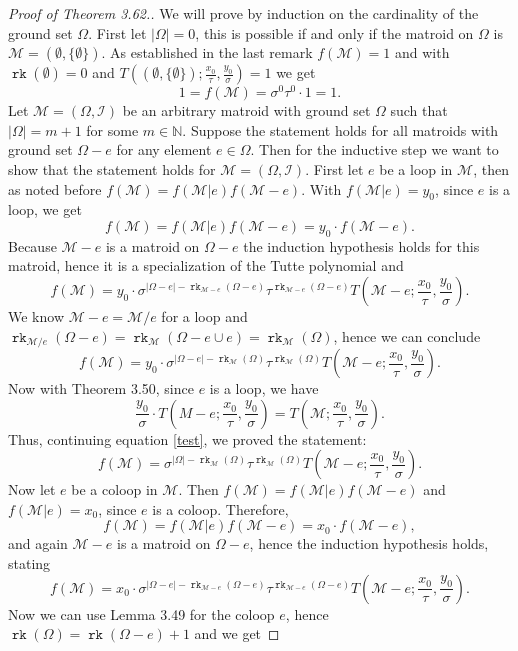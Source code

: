 \documentclass[12pt,a4paper, twoside, autooneside=false]{scrartcl}
\theoremstyle{definition}
\theoremstyle{remark}
\numberwithin{equation}{section}
\DeclareMathOperator{\rk}{\mathtt{rk}}
\newcommand{\M}{\mathcal{M}} %
\begin{document}
\begin{proof}[Proof of Theorem 3.62.]
We will prove by induction on the cardinality of the ground set $\Omega$. First let $|\Omega| = 0$, this is possible if and only if the matroid on $\Omega$ is $\M = (\emptyset, \{\emptyset\})$. As established in the last remark $f(\M)= 1$ and with $\rk(\emptyset) = 0$ and $T((\emptyset, \{\emptyset\}); \frac{x_0}{\tau}, \frac{y_0}{\sigma}) = 1$ we get 
\[
1 = f(\M) = \sigma^0 \tau^0 \cdot 1 = 1. 
\]
Let $\M = (\Omega, \mathcal{I})$ be an arbitrary matroid with ground set $\Omega$ such that $|\Omega| = m + 1$ for some $m \in \mathbb{N}$. Suppose the statement holds for all matroids with ground set $\Omega - e$ for any element $e \in \Omega$. Then for the inductive step we want to show that the statement holds for $\M = (\Omega, \mathcal{I})$. First let $e$ be a loop in $\M$, then as noted before $f(\M) = f(\M|e)f(\M - e)$. With $f(\M|e) = y_0$, since $e$ is a loop, we get 
\[
f(\M) = f(\M |e) f(\M - e) = y_0 \cdot f(\M - e).
\]
Because $\M - e$ is a matroid on $\Omega - e$ the induction hypothesis holds for this matroid, hence it is a specialization of the Tutte polynomial and
\[
f(\M) = y_0 \cdot \sigma^{|\Omega - e| - \rk_{\M - e}(\Omega - e)}\tau^{\rk_{\M - e}(\Omega - e)}T\left(\M - e; \frac{x_0}{\tau}, \frac{y_0}{\sigma}\right).
\]
We know $\M - e = \M / e$ for a loop and $\rk_{\M / e}(\Omega - e) = \rk_\M(\Omega - e \cup e) = \rk_\M(\Omega)$, hence we can conclude 
\begin{equation}\label{test}
f(\M) = y_0 \cdot \sigma^{|\Omega - e| - \rk_{\M}(\Omega)}\tau^{\rk_{\M}(\Omega)}T\left(\M - e; \frac{x_0}{\tau}, \frac{y_0}{\sigma}\right).
\end{equation} Now with Theorem 3.50, since $e$ is a loop, we have
\[
\frac{y_0}{\sigma} \cdot T\left(M - e; \frac{x_0}{\tau}, \frac{y_0}{\sigma}\right) = T\left(\M; \frac{x_0}{\tau}, \frac{y_0}{\sigma}\right).
\]
Thus, continuing equation \eqref{test}, we proved the statement: 
\[
f(\M)
= \sigma^{|\Omega| - \rk_{\M}(\Omega)}\tau^{\rk_{\M}(\Omega)}T\left(\M - e; \frac{x_0}{\tau}, \frac{y_0}{\sigma}\right).
\]
Now let $e$ be a coloop in $\M$. Then $f(\M) = f(\M|e) f(\M - e)$ and $f(\M|e) = x_0$, since $e$ is a coloop. Therefore,
\[
f(\M) = f(\M|e) f(\M - e) = x_0 \cdot f(\M - e),
\]
and again $\M - e$ is a matroid on $\Omega - e$, hence the induction hypothesis holds, stating
\[
f(\M) = x_0 \cdot \sigma^{|\Omega - e| - \rk_{\M - e}(\Omega - e)}\tau^{\rk_{\M - e}(\Omega - e)}T\left(\M - e; \frac{x_0}{\tau}, \frac{y_0}{\sigma}\right).
\]
Now we can use Lemma 3.49 for the coloop $e$, hence $\rk(\Omega) = \rk(\Omega - e) + 1$ and we get 

\end{proof}
\end{document}
